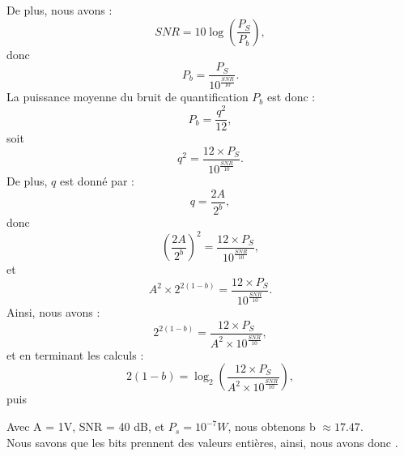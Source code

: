De plus, nous avons :
\begin{equation}
SNR = 10 \log \left( \frac{P_S}{P_b} \right),
\end{equation}
donc
\begin{equation}
P_b = \frac{P_S}{10^{\frac{SNR}{10}}}.
\end{equation}
La puissance moyenne du bruit de quantification \( P_b \) est donc :
\begin{equation}
P_b = \frac{q^2}{12},
\end{equation}
soit
\begin{equation}
q^2 = \frac{12 \times P_S}{10^{\frac{SNR}{10}}}.
\end{equation}
De plus, \( q \) est donné par :
\begin{equation}
q = \frac{2A}{2^b},
\end{equation}
donc
\begin{equation}
\left( \frac{2A}{2^b} \right)^2 = \frac{12 \times P_S}{10^{\frac{SNR}{10}}},
\end{equation}
et
\begin{equation}
A^2 \times 2^{2(1-b)} = \frac{12 \times P_S}{10^{\frac{SNR}{10}}}.
\end{equation}
Ainsi, nous avons :
\begin{equation}
2^{2(1-b)} = \frac{12 \times P_S}{A^2 \times 10^{\frac{SNR}{10}}},
\end{equation}
et en terminant les calculs :
\begin{equation}
2(1-b) = \log_2 \left( \frac{12 \times P_S}{A^2 \times 10^{\frac{SNR}{10}}} \right),
\end{equation}
puis



Avec A = 1V, SNR = 40 dB, et $P_s = 10 ^{-7} W$, nous obtenons b $\approx 17.47.$
\\
Nous savons que les bits prennent des valeurs entières, ainsi, nous avons donc .


